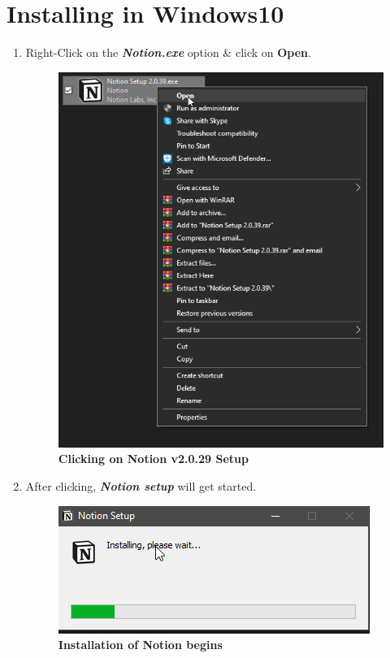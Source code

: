 \section{Installing in Windows10}
\begin{enumerate}
    \item Right-Click on the \textbf{\textit{Notion.exe}} option \& click on \textbf{Open}.
        \begin{figure}[h]
        \centering
        \includegraphics[scale=0.45]{gfx/6.png}
        \caption{\textbf{Clicking on Notion v2.0.29 Setup}}
        \label{fig_GN}
        \end{figure}
    \item After clicking, \textbf{\textit{Notion setup}} will get started.
        \begin{figure}[h]
        \centering
        \includegraphics[scale=0.4]{gfx/7.png}
        \caption{\textbf{Installation of Notion begins}}
        \label{fig_GN}
        \end{figure}
\end{enumerate}
\newpage


